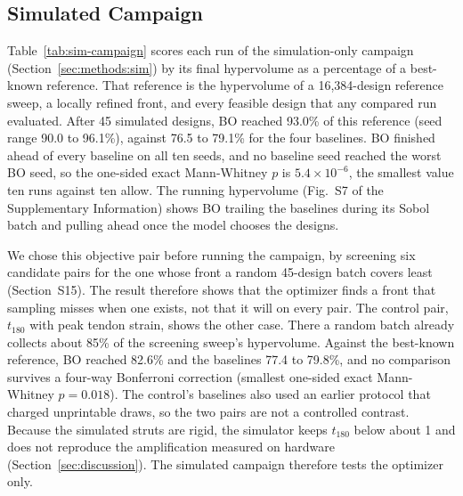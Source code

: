 \documentclass[11pt]{article}
\begin{document}
\subsection{Simulated Campaign}
\label{sec:results:sim}

Table~\ref{tab:sim-campaign} scores each run of the simulation-only
campaign (Section~\ref{sec:methods:sim}) by its final hypervolume as a
percentage of a best-known reference. That reference is the
hypervolume of a 16,384-design reference sweep, a locally refined
front, and every feasible design that any compared run evaluated. After 45 simulated
designs, BO reached 93.0\% of this reference (seed range 90.0 to
96.1\%), against 76.5 to 79.1\% for the four baselines. BO finished
ahead of every baseline on all ten seeds, and no baseline seed reached
the worst BO seed, so the one-sided exact Mann-Whitney $p$ is
$5.4\times10^{-6}$, the smallest value ten runs against ten allow. The
running hypervolume (Fig.~S7 of the
Supplementary Information) shows BO trailing the baselines during its
Sobol batch and pulling ahead once the model chooses the designs.

We chose this objective pair before running the campaign, by screening
six candidate pairs for the one whose front a random 45-design batch
covers least (Section~S15). The result therefore
shows that the optimizer finds a front that sampling misses when one
exists, not that it will on every pair. The control pair, $t_{180}$
with peak tendon strain, shows the other case. There a random batch
already collects about 85\% of the screening sweep's hypervolume.
Against the best-known reference, BO reached 82.6\% and the baselines
77.4 to 79.8\%, and no comparison survives a four-way
Bonferroni correction (smallest one-sided exact Mann-Whitney $p = 0.018$). The control's
baselines also used an earlier protocol that charged unprintable
draws, so the two pairs are not a controlled contrast. Because the
simulated struts are rigid, the simulator keeps $t_{180}$ below about 1
and does not reproduce the amplification measured on hardware
(Section~\ref{sec:discussion}). The simulated campaign therefore tests
the optimizer only.
\end{document}
